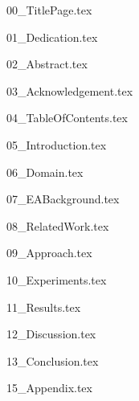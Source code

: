 \documentclass[version=last, pagesize=auto, paper=a4]{scrartcl}
\numberwithin{equation}{section}
\begin{document}
{00_TitlePage.tex}

{01_Dedication.tex}

{02_Abstract.tex}

{03_Acknowledgement.tex}

{04_TableOfContents.tex}

{05_Introduction.tex}

{06_Domain.tex}

{07_EABackground.tex}

{08_RelatedWork.tex}


{09_Approach.tex}

{10_Experiments.tex}

{11_Results.tex}

{12_Discussion.tex}

{13_Conclusion.tex}


\clearpage



{15_Appendix.tex}

\end{document}
